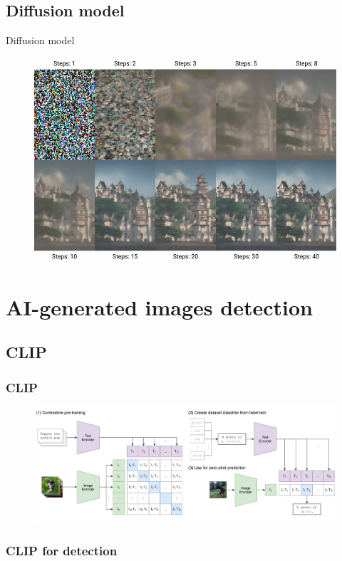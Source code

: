 \documentclass[11pt,compress]{beamer} %
\begin{document}
\subsection{Diffusion model}
\begin{frame}{Diffusion model}
  \begin{figure}
    \includegraphics[width=.8\textwidth]{img/diffusion.png}
  \end{figure}
\end{frame}

\section{AI-generated images detection}
\subsection{CLIP}
\begin{frame}
    \frametitle{CLIP}
    \begin{figure}
        \includegraphics[width=\textwidth]{img/CLIP.png}
    \end{figure}
\end{frame}

\begin{frame}
  \frametitle{CLIP for detection}
\end{frame}
\end{document}
